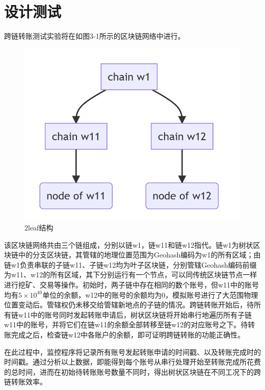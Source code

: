 \section{设计测试}

跨链转账测试实验将在如图3-1所示的区块链网络中进行。

\begin{figure}[htbp]
    \centering
    \includegraphics[width=\textwidth]{images/2leaf-structure.png}
    \caption{2leaf结构}\label{2leaf结构} %
\end{figure}

该区块链网络共由三个链组成，分别以链w1，链w11和链w12指代。链w1为树状区块链中的分支区块链，其管辖的地理位置范围为Geohash编码为w1的所有区域；由链w1负责串联的子链w11、子链w12均为叶子区块链，分别管辖Geohash编码前缀为w11、w12的所有区域，其下分别运行有一个节点，可以同传统区块链节点一样进行挖矿、交易等操作。初始时，两子链中存在相同的数个账号，但w11中的账号均有$5 \times 10^{40}$单位的余额，w12中的账号的余额均为0，模拟账号进行了大范围物理位置变动后。管辖权仍未移交给管辖新地点的子链的情况。跨链转账开始后，待所有链w11中的账号同时发起转账申请后，树状区块链将开始串行地遍历所有子链w11中的账号，并将它们在链w11的余额全部转移至链w12的对应账号之下。待转账完成之后，检查链w12中各账户的余额，即可证明跨链转账的功能正确性。

在此过程中，监控程序将记录所有账号发起转账申请的时间戳、以及转账完成时的时间戳。通过分析以上数据，即能得到每个账号从串行处理开始至转账完成所花费的总时间，进而在初始待转账账号数量不同时，得出树状区块链在不同工况下的跨链转账效率。

